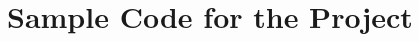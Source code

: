\documentclass{article}
\begin{document}
	\newpage
	
	
	
	
	
	\newpage
	\appendix
	
	\section{Sample Code for the Project}
	\label{appendix:data_trans}
	
	\begin{figure}[ht]
		\centering
	\end{figure}
\end{document}
